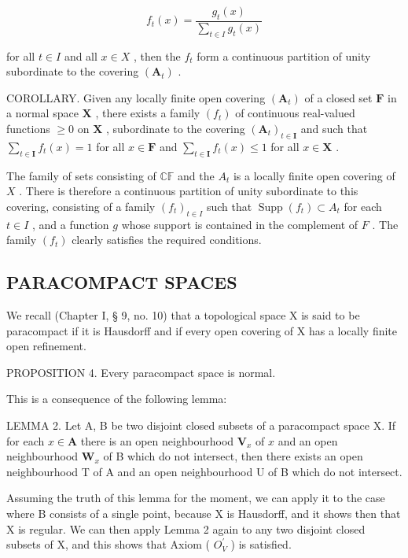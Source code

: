 \[
f _ {t} (x) = \frac {g _ {t} (x)}{\sum_ {t \in I} g _ {t} (x)}
\]

for all \(t \in I\) and all \(x \in X\) , then the \(f_t\) form a continuous partition of unity subordinate to the covering \((\mathbf{A}_t)\) .

COROLLARY. Given any locally finite open covering \((\mathbf{A}_t)\) of a closed set \(\mathbf{F}\) in a normal space \(\mathbf{X}\) , there exists a family \((f_t)\) of continuous real-valued functions \(\geqslant 0\) on \(\mathbf{X}\) , subordinate to the covering \((\mathbf{A}_t)_{t \in \mathbf{I}}\) and such that \(\sum_{t \in \mathbf{I}} f_t(x) = 1\) for all \(x \in \mathbf{F}\) and \(\sum_{t \in \mathbf{I}} f_t(x) \leqslant 1\) for all \(x \in \mathbf{X}\) .

The family of sets consisting of \(\mathbb{CF}\) and the \(A_{t}\) is a locally finite open covering of \(X\) . There is therefore a continuous partition of unity subordinate to this covering, consisting of a family \((f_{t})_{t\in I}\) such that \(\operatorname{Supp}(f_t)\subset A_t\) for each \(t\in I\) , and a function \(g\) whose support is contained in the complement of \(F\) . The family \((f_{t})\) clearly satisfies the required conditions.

\subsection{PARACOMPACT SPACES}

We recall (Chapter I, § 9, no. 10) that a topological space X is said to be paracompact if it is Hausdorff and if every open covering of X has a locally finite open refinement.

PROPOSITION 4. Every paracompact space is normal.

This is a consequence of the following lemma:

LEMMA 2. Let A, B be two disjoint closed subsets of a paracompact space X. If for each \(x \in \mathbf{A}\) there is an open neighbourhood \(\mathbf{V}_x\) of \(x\) and an open neighbourhood \(\mathbf{W}_x\) of B which do not intersect, then there exists an open neighbourhood T of A and an open neighbourhood U of B which do not intersect.

Assuming the truth of this lemma for the moment, we can apply it to the case where B consists of a single point, because X is Hausdorff, and it shows then that X is regular. We can then apply Lemma 2 again to any two disjoint closed subsets of X, and this shows that Axiom ( \(O_{V}^{\prime}\) ) is satisfied.

